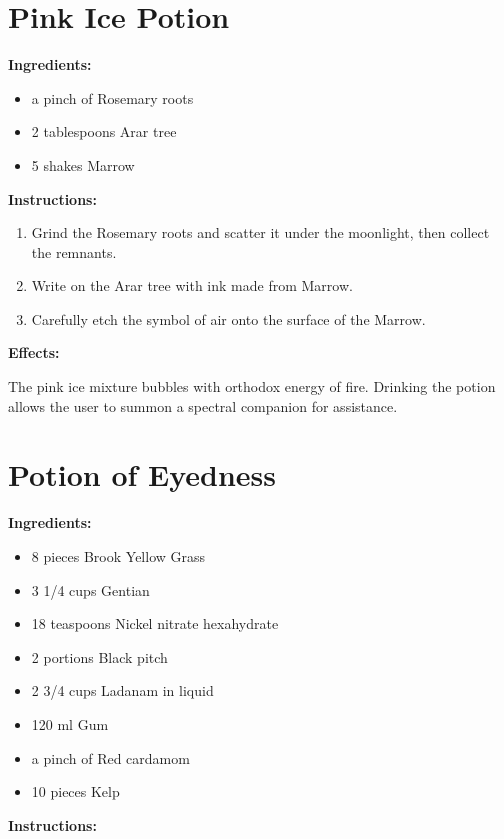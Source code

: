 \documentclass{article}
\begin{document}
\newpage
\section*{Pink Ice Potion}

\textbf{Ingredients:}

\begin{itemize}
  \item a pinch of Rosemary roots
  \item 2 tablespoons Arar tree
  \item 5 shakes Marrow
\end{itemize}

\textbf{Instructions:}

\begin{enumerate}
  \item Grind the Rosemary roots and scatter it under the moonlight, then collect the remnants.
  \item Write on the Arar tree with ink made from Marrow.
  \item Carefully etch the symbol of air onto the surface of the Marrow.
\end{enumerate}

\textbf{Effects:}

The pink ice mixture bubbles with orthodox energy of fire. Drinking the potion allows the user to summon a spectral companion for assistance.

\newpage
\section*{Potion of Eyedness}

\textbf{Ingredients:}

\begin{itemize}
  \item 8 pieces Brook Yellow Grass
  \item 3 1/4 cups Gentian
  \item 18 teaspoons Nickel nitrate hexahydrate
  \item 2 portions Black pitch
  \item 2 3/4 cups Ladanam in liquid
  \item 120 ml Gum
  \item a pinch of Red cardamom
  \item 10 pieces Kelp
\end{itemize}

\textbf{Instructions:}
\end{document}
